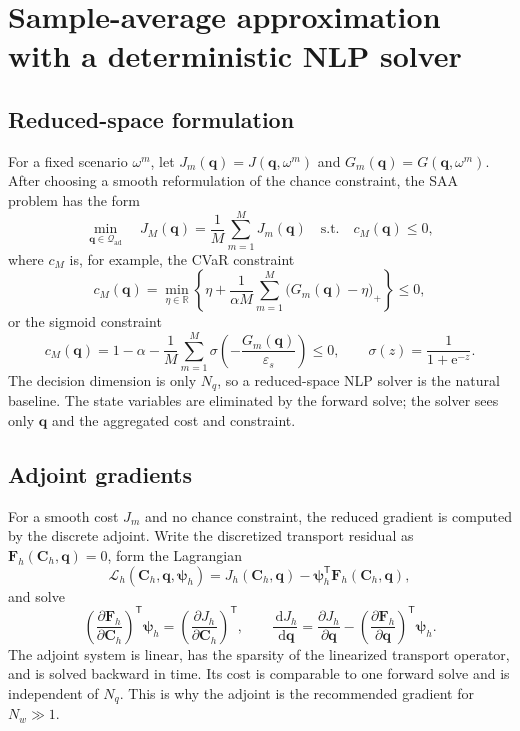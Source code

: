 \documentclass[11pt]{article}
\numberwithin{equation}{section}
\newcommand{\R}{\mathbb{R}}
\newcommand{\dd}{\,\mathrm{d}}
\newcommand{\qq}{\mathbf{q}}
\newcommand{\T}{\mathsf{T}}
\newcommand{\me}{\mathrm{e}}
\theoremstyle{plain}
\begin{document}
\section{Sample-average approximation with a deterministic NLP solver}
\label{sec:saa-nlp}

\subsection{Reduced-space formulation}

For a fixed scenario $\omega^m$, let $J_m(\qq)=J(\qq,\omega^m)$ and
$G_m(\qq)=G(\qq,\omega^m)$.  After choosing a smooth reformulation of the
chance constraint, the SAA problem has the form
\begin{equation}
\label{eq:saa-nlp}
\min_{\qq\in\mathcal{Q}_{\mathrm{ad}}}\quad
J_M(\qq)=\frac{1}{M}\sum_{m=1}^{M}J_m(\qq)
\quad\text{s.t.}\quad
c_M(\qq)\le0,
\end{equation}
where $c_M$ is, for example, the CVaR constraint
\begin{equation}
\label{eq:cvar-constraint}
c_M(\qq)=\min_{\eta\in\R}\left\{
\eta+\frac{1}{\alpha M}\sum_{m=1}^{M}
\bigl(G_m(\qq)-\eta\bigr)_+
\right\}\le0,
\end{equation}
or the sigmoid constraint
\begin{equation}
\label{eq:sigmoid-constraint}
c_M(\qq)=1-\alpha-\frac{1}{M}\sum_{m=1}^{M}
\sigma\!\left(-\frac{G_m(\qq)}{\varepsilon_s}\right)\le0,
\qquad
\sigma(z)=\frac{1}{1+\me^{-z}}.
\end{equation}
The decision dimension is only $N_q$, so a reduced-space NLP solver is the
natural baseline.  The state variables are eliminated by the forward solve;
the solver sees only $\qq$ and the aggregated cost and constraint.

\subsection{Adjoint gradients}

For a smooth cost $J_m$ and no chance constraint, the reduced gradient is
computed by the discrete adjoint.  Write the discretized transport residual as
$\mathbf{F}_h(\mathbf{C}_h,\qq)=0$, form the Lagrangian
\begin{equation}
\label{eq:discreteL}
\mathcal{L}_h(\mathbf{C}_h,\qq,\bm{\psi}_h)
=J_h(\mathbf{C}_h,\qq)
-\bm{\psi}_h^{\T}\mathbf{F}_h(\mathbf{C}_h,\qq),
\end{equation}
and solve
\begin{equation}
\label{eq:discreteadj}
\left(\frac{\partial\mathbf{F}_h}{\partial\mathbf{C}_h}\right)^{\T}
\bm{\psi}_h
=\left(\frac{\partial J_h}{\partial\mathbf{C}_h}\right)^{\T},
\qquad
\frac{\dd J_h}{\dd\qq}
=\frac{\partial J_h}{\partial\qq}
-\left(\frac{\partial\mathbf{F}_h}{\partial\qq}\right)^{\T}
\bm{\psi}_h.
\end{equation}
The adjoint system is linear, has the sparsity of the linearized transport
operator, and is solved backward in time.  Its cost is comparable to one
forward solve and is independent of $N_q$.  This is why the adjoint is the
recommended gradient for $N_w\gg1$.
\end{document}
